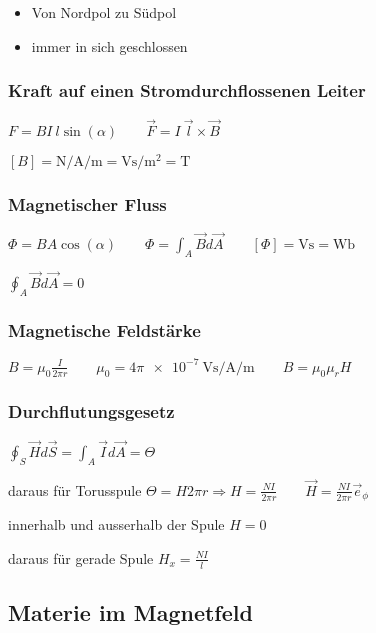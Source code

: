 \documentclass[10pt,a4paper]{scrartcl}
\begin{document}
\begin{multicols*}{3}
	\begin{itemize}
	\compaq
	\item
	Von Nordpol zu Südpol
	\item
	immer in sich geschlossen
	\end{itemize}
	
	 
	
	\subsubsection{Kraft auf einen Stromdurchflossenen Leiter}
	
	$F=BI\ l\sin(\alpha)\qquad\vec{F}=I\ \vec{l}\times\vec{B}$
	
	$[B]=\si{\newton\per\ampere\per\meter}=\si{\volt\second\per\meter\squared}=\si{\tesla}$
	
	 
	
	\subsubsection{Magnetischer Fluss}
	
	$\Phi=BA\cos(\alpha)\qquad\Phi=\int_A{\vec{B}d\vec{A}}\qquad [\Phi]=\si{\volt\second}=\si{\weber}$
	
	$\oint_A{\vec{B}d\vec{A}=0}$
	
	 
	
	\subsubsection{Magnetische Feldstärke}
	
	$B=\mu_0\frac{I}{2\pi r}\qquad \mu_0=4\pi\SI{e-7}{\volt\second\per\ampere\per\meter}\qquad B=\mu_0\mu_r H$
	
	 	
	
	\subsubsection{Durchflutungsgesetz}
	
	$\oint_S{\vec{H}d\vec{S}}=\int_A{\vec{I}d\vec{A}}=\Theta$
	
	daraus für Torusspule $\Theta=H2\pi r\Rightarrow H=\frac{NI}{2\pi r}\qquad\vec{H}=\frac{NI}{2\pi r}\vec{e}_\phi$

	innerhalb und ausserhalb der Spule $H = 0$	
	
	daraus für gerade Spule $H_x=\frac{NI}{l}$
	
	 
	
	\subsection{Materie im Magnetfeld}
	

\end{multicols*}
\end{document}

